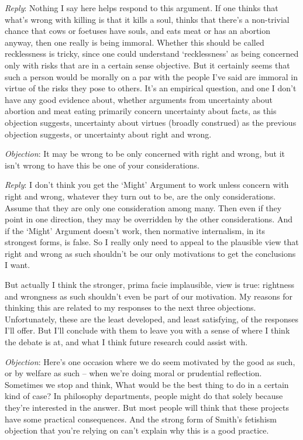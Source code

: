 \emph{Reply}: Nothing I say here helps respond to this argument. If one thinks that what's wrong with killing is that it kills a soul, thinks that there's a non-trivial chance that cows or foetuses have souls, and eats meat or has an abortion anyway, then one really is being immoral. Whether this should be called recklessness is tricky, since one could understand `recklessness' as being concerned only with risks that are in a certain sense objective. But it certainly seems that such a person would be morally on a par with the people I've said are immoral in virtue of the risks they pose to others. It's an empirical question, and one I don't have any good evidence about, whether arguments from uncertainty about abortion and meat eating primarily concern uncertainty about facts, as this objection suggests, uncertainty about virtues (broadly construed) as the previous objection suggests, or uncertainty about right and wrong.

\emph{Objection}: It may be wrong to be only concerned with right and wrong, but it isn't wrong to have this be one of your considerations.

\emph{Reply}: I don't think you get the `Might' Argument to work unless concern with right and wrong, whatever they turn out to be, are the only considerations. Assume that they are only one consideration among many. Then even if they point in one direction, they may be overridden by the other considerations. And if the `Might' Argument doesn't work, then normative internalism, in its strongest forms, is false. So I really only need to appeal to the plausible view that right and wrong as such shouldn't be our only motivations to get the conclusions I want.

But actually I think the stronger, prima facie implausible, view is true: rightness and wrongness as such shouldn't even be part of our motivation. My reasons for thinking this are related to my responses to the next three objections. Unfortunately, these are the least developed, and least satisfying, of the responses I'll offer. But I'll conclude with them to leave you with a sense of where I think the debate is at, and what I think future research could assist with.

\emph{Objection}: Here's one occasion where we do seem motivated by the good as such, or by welfare as such -- when we're doing moral or prudential reflection. Sometimes we stop and think, What would be the best thing to do in a certain kind of case? In philosophy departments, people might do that solely because they're interested in the answer. But most people will think that these projects have some practical consequences. And the strong form of Smith's fetishism objection that you're relying on can't explain why this is a good practice.

